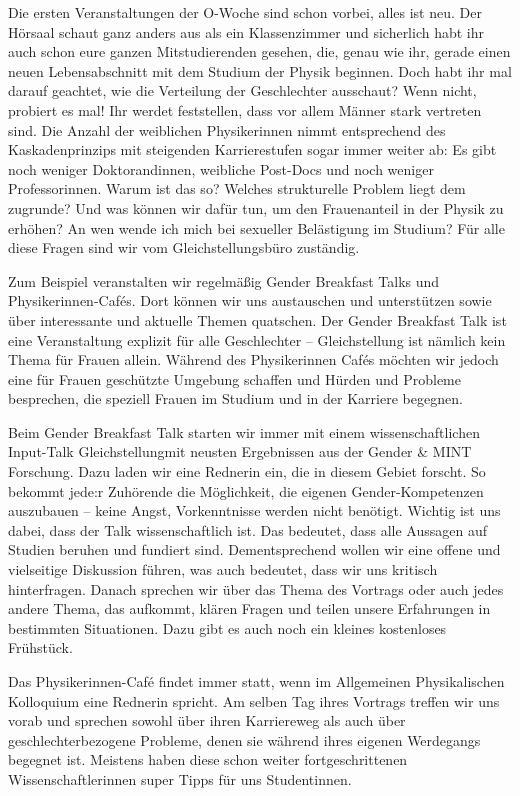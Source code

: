 \begin{multicols}{2}

Die ersten Veranstaltungen der O-Woche sind schon vorbei, alles ist neu. Der Hörsaal schaut ganz anders aus als ein Klassenzimmer und sicherlich habt ihr auch schon eure ganzen Mitstudierenden gesehen, die, genau wie ihr, gerade einen neuen Lebensabschnitt mit dem Studium der Physik beginnen. Doch habt ihr mal darauf geachtet, wie die Verteilung der Geschlechter ausschaut? Wenn nicht, probiert es mal! Ihr werdet feststellen, dass vor allem Männer stark vertreten sind. Die Anzahl der weiblichen Physikerinnen nimmt entsprechend des Kaskadenprinzips mit steigenden Karrierestufen sogar immer weiter ab: Es gibt noch weniger Doktorandinnen, weibliche Post-Docs und noch weniger Professorinnen. Warum ist das so? Welches strukturelle Problem liegt dem zugrunde? Und was können wir dafür tun, um den Frauenanteil in der Physik zu erhöhen? An wen wende ich mich bei sexueller Belästigung im Studium? Für alle diese Fragen sind wir vom Gleichstellungsbüro zuständig.

Zum Beispiel veranstalten wir regelmäßig Gender Breakfast Talks und Physikerinnen-Cafés. Dort können wir uns austauschen und unterstützen sowie über interessante und aktuelle Themen quatschen. Der Gender Breakfast Talk ist eine Veranstaltung explizit für alle Geschlechter – Gleichstellung ist nämlich kein Thema für Frauen allein. Während des Physikerinnen Cafés möchten wir jedoch eine für Frauen geschützte Umgebung schaffen und Hürden und Probleme besprechen, die speziell Frauen im Studium und in der Karriere begegnen.

Beim Gender Breakfast Talk starten wir immer mit einem wissenschaftlichen Input-Talk Gleichstellungmit neusten Ergebnissen aus der Gender \& MINT Forschung. Dazu laden wir eine Rednerin ein, die in diesem Gebiet forscht. So bekommt jede:r Zuhörende die Möglichkeit, die eigenen Gender-Kompetenzen auszubauen – keine Angst, Vorkenntnisse werden nicht benötigt. Wichtig ist uns dabei, dass der Talk wissenschaftlich ist. Das bedeutet, dass alle Aussagen auf Studien beruhen und fundiert sind. Dementsprechend wollen wir eine offene und vielseitige Diskussion führen, was auch bedeutet, dass wir uns kritisch hinterfragen. Danach sprechen wir über das Thema des Vortrags oder auch jedes andere Thema, das aufkommt, klären Fragen und teilen unsere Erfahrungen in bestimmten Situationen. Dazu gibt es auch noch ein kleines kostenloses Frühstück.

Das Physikerinnen-Café findet immer statt, wenn im Allgemeinen Physikalischen Kolloquium eine Rednerin spricht. Am selben Tag ihres Vortrags treffen wir uns vorab und sprechen sowohl über ihren Karriereweg als auch über geschlechterbezogene Probleme, denen sie während ihres eigenen Werdegangs begegnet ist. Meistens haben diese schon weiter fortgeschrittenen Wissenschaftlerinnen super Tipps für uns Studentinnen.


\end{multicols}
